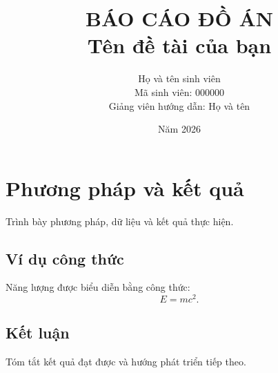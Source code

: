 \documentclass[12pt,a4paper]{report}
\title{BÁO CÁO ĐỒ ÁN\\[1cm]\Large Tên đề tài của bạn}
\author{Họ và tên sinh viên\\Mã sinh viên: 000000\\Giảng viên hướng dẫn: Họ và tên}
\date{Năm 2026}
\begin{document}
\maketitle
\tableofcontents

\chapter{Phương pháp và kết quả}
Trình bày phương pháp, dữ liệu và kết quả thực hiện.
\section{Ví dụ công thức}
Năng lượng được biểu diễn bằng công thức:
\[
E = mc^2.
\]
\section{Kết luận}
Tóm tắt kết quả đạt được và hướng phát triển tiếp theo.
\end{document}
